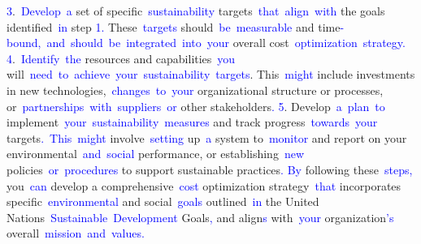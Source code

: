 \documentclass{article}
\begin{document}
\begin{tcolorbox}[colframe=black,colback=white]
{}\textcolor{blue}{3}.\textcolor{blue}{~Develop}\textcolor{blue}{~a} set of specific\textcolor{blue}{~sustainability} targets\textcolor{blue}{~that}\textcolor{blue}{~align}\textcolor{blue}{~with} the goals identified\textcolor{blue}{~in} step \textcolor{blue}{1}\textcolor{blue}{.} These\textcolor{blue}{~targets} should\textcolor{blue}{~be}\textcolor{blue}{~measurable} and time\textcolor{blue}{-bound}\textcolor{blue}{,}\textcolor{blue}{~and}\textcolor{blue}{~should}\textcolor{blue}{~be}\textcolor{blue}{~integrated}\textcolor{blue}{~into}\textcolor{blue}{~your} overall cost\textcolor{blue}{~optimization}\textcolor{blue}{~strategy}\textcolor{blue}{.
}\textcolor{blue}{4}.\textcolor{blue}{~Identify}\textcolor{blue}{~the} resources and capabilities\textcolor{blue}{~you} will\textcolor{blue}{~need}\textcolor{blue}{~to}\textcolor{blue}{~achieve}\textcolor{blue}{~your}\textcolor{blue}{~sustainability}\textcolor{blue}{~targets}. This\textcolor{blue}{~might} include investments in new technologies,\textcolor{blue}{~changes}\textcolor{blue}{~to}\textcolor{blue}{~your} organizational structure or processes, or\textcolor{blue}{~partnerships}\textcolor{blue}{~with}\textcolor{blue}{~suppliers}\textcolor{blue}{~or} other stakeholders\textcolor{blue}{.
}\textcolor{blue}{5}. Develop\textcolor{blue}{~a}\textcolor{blue}{~plan}\textcolor{blue}{~to} implement\textcolor{blue}{~your}\textcolor{blue}{~sustainability}\textcolor{blue}{~measures} and track progress\textcolor{blue}{~towards}\textcolor{blue}{~your} targets\textcolor{blue}{.}\textcolor{blue}{~This}\textcolor{blue}{~might} involve\textcolor{blue}{~setting} up\textcolor{blue}{~a} system to\textcolor{blue}{~monitor} and report on your environmental\textcolor{blue}{~and}\textcolor{blue}{~social} performance, or establishing\textcolor{blue}{~new} policies\textcolor{blue}{~or}\textcolor{blue}{~procedures} to support sustainable practices\textcolor{blue}{.
}\textcolor{blue}{By} following these\textcolor{blue}{~steps}\textcolor{blue}{,} you\textcolor{blue}{~can} develop a comprehensive\textcolor{blue}{~cost} optimization strategy\textcolor{blue}{~that} incorporates specific\textcolor{blue}{~environmental} and social\textcolor{blue}{~goals} outlined\textcolor{blue}{~in} the United Nations\textcolor{blue}{~Sustainable}\textcolor{blue}{~Development} Goals\textcolor{blue}{,} and align\textcolor{blue}{s} with\textcolor{blue}{~your} organization\textcolor{blue}{'s} overall\textcolor{blue}{~mission}\textcolor{blue}{~and}\textcolor{blue}{~values}\textcolor{blue}{.}\textcolor{blue}{}
\end{tcolorbox}
\end{document}
